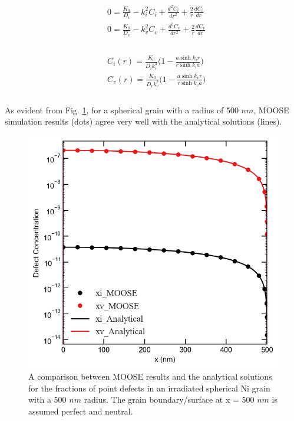 \documentclass[utf8]{frontiersSCNS} %
\begin{document}
    \begin{equation}
        \begin{aligned}
          &0 = \frac{K_0}{D_i} - k_i^2C_i + \frac{d^2C_i}{dr^2}+\frac{2}{r}\frac{dC_i}{dr}\\
          &0 = \frac{K_0}{D_v} - k_v^2C_v + \frac{d^2C_v}{dr^2}+\frac{2}{r}\frac{dC_v}{dr}\\
        \end{aligned}
        \label{equation:spherical_norecomb_point_defect_equations}
    \end{equation}
    \\
    \begin{equation}
        \begin{aligned}
          &C_i(r)=\frac{K_0}{D_ik_i^2}\bigg(1-\frac{a\sinh{k_ir}}{r\sinh{k_ia}}\bigg)\\
          &C_v(r)=\frac{K_0}{D_vk_v^2}\bigg(1-\frac{a\sinh{k_vr}}{r\sinh{k_va}}\bigg)\\
        \end{aligned}
        \label{equation:spherical_grain_analytical_solution}
    \end{equation}\\
    As evident from Fig. \ref{figure:concentrations_MOOSE_analytical}, for a spherical grain with a radius of 500 $nm$, MOOSE simulation results (dots) agree very well with the analytical solutions (lines).\\
 
    \begin{figure}[h!]
        \centering
        \includegraphics[scale=0.55]{Fig1}
        \caption{A comparison between MOOSE results and the analytical solutions for the fractions of point defects in an irradiated spherical Ni grain with a 500 $nm$ radius. The grain boundary/surface at x = 500 $nm$ is assumed perfect and neutral.}
        \label{figure:concentrations_MOOSE_analytical}
    \end{figure}
\end{document}
